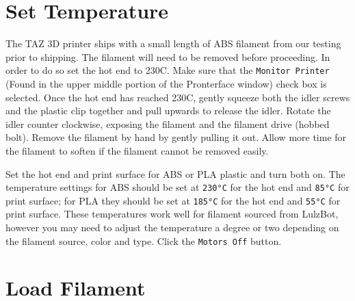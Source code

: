 \section{Set Temperature}
The TAZ 3D printer ships with a small length of ABS filament from our testing prior to shipping. The filament will need to be removed before proceeding. In order to do so set the hot end to 230C. Make sure that the \texttt{Monitor Printer} (Found in the upper middle portion of the Pronterface window) check box is selected. Once the hot end has reached 230C, gently squeeze both the idler screws and the plastic clip together and pull upwards to release the idler. Rotate the idler counter clockwise, exposing the filament and the filament drive (hobbed bolt). Remove the filament by hand by gently pulling it out. Allow more time for the filament to soften if the filament cannot be removed easily.

Set the hot end and print surface for ABS or PLA plastic and turn both on. The temperature settings for ABS should be set at \texttt{230°C} for the hot end and \texttt{85°C} for print surface; for PLA they should be set at \texttt{185°C} for the hot end and \texttt{55°C} for print surface. These temperatures work well for filament sourced from LulzBot, however you may need to adjust the temperature a degree or two depending on the filament source, color and type. Click the \texttt{Motors Off} button.
\section{Load Filament}


